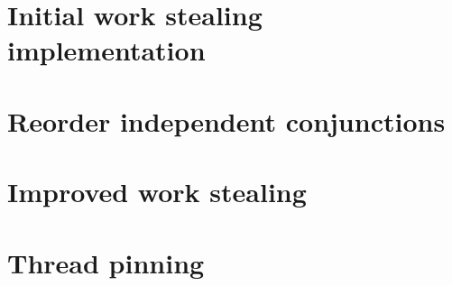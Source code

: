 

\section{Initial work stealing implementation}
\label{sec:rts_work_stealing}



\section{Reorder independent conjunctions}
\label{sec:rts_reorder}



\section{Improved work stealing}
\label{sec:rts_work_stealing2}



\section{Thread pinning}
\label{sec:rts_thread_pinning}



%


